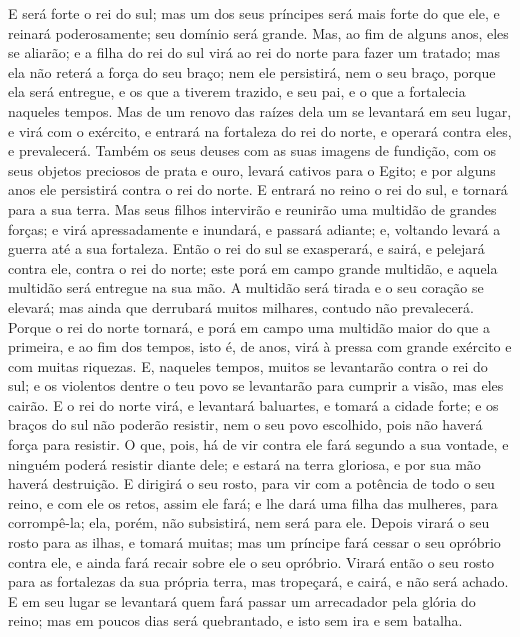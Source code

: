 E será forte o rei do sul; mas um dos seus príncipes será mais
forte do que ele, e reinará poderosamente; seu domínio será grande.
Mas, ao fim de alguns anos, eles se aliarão; e a filha do rei do
sul virá ao rei do norte para fazer um tratado; mas ela não reterá a
força do seu braço; nem ele persistirá, nem o seu braço, porque ela
será entregue, e os que a tiverem trazido, e seu pai, e o que a
fortalecia naqueles tempos. Mas de um renovo das raízes dela um
se levantará em seu lugar, e virá com o exército, e entrará na
fortaleza do rei do norte, e operará contra eles, e prevalecerá.
Também os seus deuses com as suas imagens de fundição, com os
seus objetos preciosos de prata e ouro, levará cativos para o Egito;
e por alguns anos ele persistirá contra o rei do norte. E
entrará no reino o rei do sul, e tornará para a sua terra.
Mas seus filhos intervirão e reunirão uma multidão de grandes
forças; e virá apressadamente e inundará, e passará adiante; e,
voltando levará a guerra até a sua fortaleza. Então o rei do
sul se exasperará, e sairá, e pelejará contra ele, contra o rei do
norte; este porá em campo grande multidão, e aquela multidão será
entregue na sua mão. A multidão será tirada e o seu coração
se elevará; mas ainda que derrubará muitos milhares, contudo não
prevalecerá. Porque o rei do norte tornará, e porá em campo
uma multidão maior do que a primeira, e ao fim dos tempos, isto é,
de anos, virá à pressa com grande exército e com muitas riquezas.
E, naqueles tempos, muitos se levantarão contra o rei do sul;
e os violentos dentre o teu povo se levantarão para cumprir a visão,
mas eles cairão. E o rei do norte virá, e levantará
baluartes, e tomará a cidade forte; e os braços do sul não poderão
resistir, nem o seu povo escolhido, pois não haverá força para
resistir. O que, pois, há de vir contra ele fará segundo a
sua vontade, e ninguém poderá resistir diante dele; e estará na
terra gloriosa, e por sua mão haverá destruição. E dirigirá o
seu rosto, para vir com a potência de todo o seu reino, e com ele os
retos, assim ele fará; e lhe dará uma filha das mulheres, para
corrompê-la; ela, porém, não subsistirá, nem será para ele.
Depois virará o seu rosto para as ilhas, e tomará muitas; mas
um príncipe fará cessar o seu opróbrio contra ele, e ainda fará
recair sobre ele o seu opróbrio. Virará então o seu rosto
para as fortalezas da sua própria terra, mas tropeçará, e cairá, e
não será achado. E em seu lugar se levantará quem fará passar
um arrecadador pela glória do reino; mas em poucos dias será
quebrantado, e isto sem ira e sem batalha.

